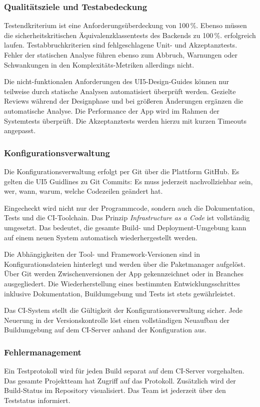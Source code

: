 \subsubsection{Qualitätsziele und Testabedeckung}
Testendkriterium ist eine Anforderungsüberdeckung von 100\,\%. Ebenso müssen die sicherheitskritischen Äquivalenzklassentests des Backends zu 100\,\%. erfolgreich laufen. Testabbruchkriterien sind fehlgeschlagene Unit- und Akzeptanztests. Fehler der statischen Analyse führen ebenso zum Abbruch, Warnungen oder Schwankungen in den Komplexitäts-Metriken allerdings nicht.

Die nicht-funktionalen Anforderungen des UI5-Design-Guides können nur teilweise durch statische Analysen automatisiert überprüft werden. Gezielte Reviews während der Designphase und bei größeren Änderungen ergänzen die automatische Analyse. Die Performance der App wird im Rahmen der Systemtests überprüft. Die Akzeptanztests werden hierzu mit kurzen Timeouts angepasst.

\subsubsection{Konfigurationsverwaltung}
Die Konfigurationsverwaltung erfolgt per Git über die Plattform GitHub. Es gelten die UI5 Guidlines zu Git Commits: Es muss jederzeit nachvollziehbar sein, wer, wann, warum, welche Codezeilen geändert hat.

Eingecheckt wird nicht nur der Programmcode, sondern auch die Dokumentation, Tests und die CI-Toolchain. Das Prinzip \textit{Infrastructure as a Code} ist vollständig umgesetzt. Das bedeutet, die gesamte Build- und Deployment-Umgebung kann auf einem neuen System automatisch wiederhergestellt werden. 

Die Abhängigkeiten der Tool- und Framework-Versionen sind in Konfigurationsdateien hinterlegt und werden über die Paketmanager aufgelöst. Über Git werden Zwischenversionen der App gekennzeichnet oder in Branches ausgegliedert. Die Wiederherstellung eines bestimmten Entwicklungsschrittes inklusive Dokumentation, Buildumgebung und Tests ist stets gewährleistet. 

Das CI-System stellt die Gültigkeit der Konfigurationsverwaltung sicher. Jede Neuerung in der Versionskontrolle löst einen vollständigen Neuaufbau der Buildumgebung auf dem CI-Server anhand der Konfiguration aus.


\subsubsection{Fehlermanagement}
Ein Testprotokoll wird für jeden Build separat auf dem CI-Server vorgehalten. Das gesamte Projektteam hat Zugriff auf das Protokoll. Zusätzlich wird der Build-Status im Repository visualisiert. Das Team ist jederzeit über den Teststatus informiert.

